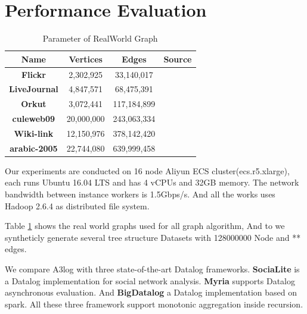 \section{Performance Evaluation}
\label{sec:expr}

\begin{table}[!t]
	\caption{Parameter of RealWorld Graph }
	\hspace{-0.15in}
	\vspace{0.0in}
	\label{tab:Dataset}
	\centering
	\small
	\begin{tabular}{c|c|c|c}
		\hline\hline
		{\textbf{Name}} &
		{\textbf{Vertices}} &
		{\textbf{Edges}} &
		{\textbf{Source}} \\
		\hline
		{\textbf{Flickr}} & 2,302,925 &33,140,017   & \cite{mislove-2008-flickr}\\
		\hline
		{\textbf{LiveJournal}} & 4,847,571 & 68,475,391 &\cite{livejournal}\\
		\hline
		{\textbf{Orkut}} &3,072,441& 117,184,899 & \cite{mislove-2007-socialnetworks} \\
		\hline
		{\textbf{culeweb09}} & 20,000,000 & 243,063,334 &\cite{clueweb}\\		\hline
		{\textbf{Wiki-link}} & 12,150,976 &378,142,420&\cite{wikilinks} \\
		\hline
		{\textbf{arabic-2005}} & 22,744,080 & 639,999,458 &\cite{arabic-2005}\\		\hline
		\hline
	\end{tabular}
	\vspace{-0.1in}
	
\end{table}
Our experiments are conducted on 16 node Aliyun ECS cluster(ecs.r5.xlarge), each runs Ubuntu 16.04 LTS and has 4 vCPUs and 32GB memory. The network bandwidth between instance workers is 1.5Gbps/s. And all the works uses Hadoop 2.6.4 as distributed file system.

Table \ref{tab:Dataset} shows the real world graphs used for all graph algorithm, And to we syntheticly generate several tree structure Datasets with 128000000 Node and  ** edges. 

We compare A3log with three state-of-the-art Datalog frameworks. \textbf{SociaLite} \cite{Lam:2013:SDE:2510649.2511289,Seo:2013:DSD:2556549.2556572} is a Datalog implementation for social network analysis. \textbf{Myria} \cite{Halperin:2014:DMB:2588555.2594530,Wang:2015:AFR:2824032.2824052} supports Datalog asynchronous evaluation. And \textbf{BigDatalog}\cite{Shkapsky:2016:BDA:2882903.2915229} a Datalog implementation based on spark. All these three framework support monotonic aggregation inside recursion.


